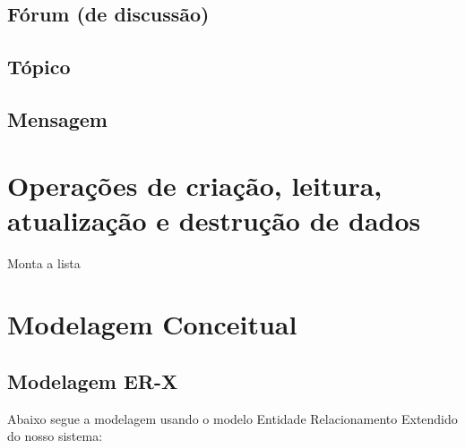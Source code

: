 \documentclass{article}
\begin{document}
	\subsection{Fórum (de discussão)}

	\subsection{Tópico}

	\subsection{Mensagem}


\section{Operações de criação, leitura, atualização e destrução de dados}

	Monta a lista


\section{Modelagem Conceitual}

	\subsection{Modelagem ER-X}
	Abaixo segue a modelagem usando o modelo Entidade Relacionamento Extendido do nosso sistema:\\
	
\end{document}

